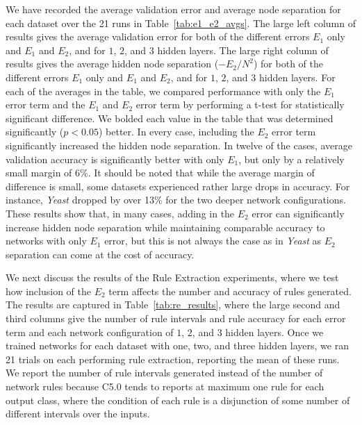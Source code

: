 We have recorded the average validation error and average node separation
for each dataset over the 21 runs in Table~\ref{tab:e1_e2_avgs}.
The large left column of results
gives the average validation error for both of the different errors
$E_1$ only and $E_1$ and $E_2$, and for $1$, $2$, and $3$ hidden layers.
The large right column of results
gives the average hidden node separation ($-E_2/N^{2}$)
for both of the different errors
$E_1$ only and $E_1$ and $E_2$, and for $1$, $2$, and $3$ hidden layers.
For each of the averages in the table, we compared performance with only the
$E_1$ error term and the $E_1$ and $E_2$ error term by performing a t-test
for statistically significant difference. We bolded each value in the table
that was determined significantly ($p < 0.05$) better.
In every case, including the $E_2$ error term
significantly increased the hidden node separation.
In twelve of the cases, average validation accuracy is significantly
better with only $E_1$, but only by a relatively small margin of
6\%. It should be noted that while the average margin of difference is
small, some datasets experienced rather large drops in accuracy. For instance,
\textit{Yeast} dropped by over 13\% for the two deeper network configurations.
These results show that, in many cases, adding in the $E_2$ error can
significantly increase hidden node separation while maintaining comparable
accuracy to networks with only $E_1$  error, but this is not always the
case as in \textit{Yeast} as $E_2$ separation can come at the cost of
accuracy.

We next discuss the results of the Rule Extraction experiments,
where we test how inclusion of the $E_2$ term affects the number
and accuracy of rules generated.
The results are
captured in Table~\ref{tab:re_results}, where the large second and
third columns
give the number of rule intervals and rule accuracy for each error term and
each network configuration of $1$, $2$, and $3$ hidden layers.
Once we trained networks for each dataset with
one, two, and three hidden layers, we ran 21 trials on each performing
rule extraction, reporting the mean of these runs. We report the
number of rule intervals generated instead of the number of network
rules because C5.0 tends to reports at maximum one rule for each output
class, where the condition of each rule is a disjunction of some number
of different intervals over the inputs.

